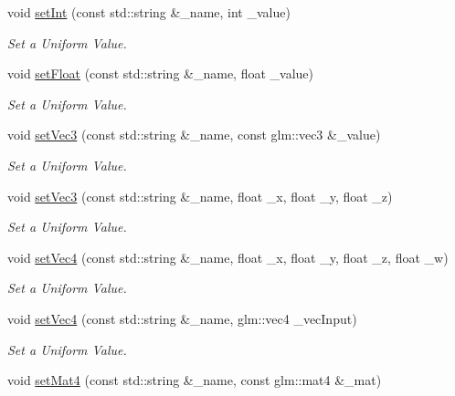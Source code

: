 \begin{DoxyCompactItemize}
void \mbox{\hyperlink{classpiolot_1_1_g_l_shader_a5b8fd3a108bf576243a1e852872edf5c}{set\+Int}} (const std\+::string \&\+\_\+name, int \+\_\+value)
\begin{DoxyCompactList}\small\item\em Set a Uniform Value. \end{DoxyCompactList}\item 
void \mbox{\hyperlink{classpiolot_1_1_g_l_shader_af6323e1d0956064de4c43ef4fa41b0f1}{set\+Float}} (const std\+::string \&\+\_\+name, float \+\_\+value)
\begin{DoxyCompactList}\small\item\em Set a Uniform Value. \end{DoxyCompactList}\item 
void \mbox{\hyperlink{classpiolot_1_1_g_l_shader_a47d614244dc667768a36b9cea1675eca}{set\+Vec3}} (const std\+::string \&\+\_\+name, const glm\+::vec3 \&\+\_\+value)
\begin{DoxyCompactList}\small\item\em Set a Uniform Value. \end{DoxyCompactList}\item 
void \mbox{\hyperlink{classpiolot_1_1_g_l_shader_a293369149f4ad507543cb0fcd783afd1}{set\+Vec3}} (const std\+::string \&\+\_\+name, float \+\_\+x, float \+\_\+y, float \+\_\+z)
\begin{DoxyCompactList}\small\item\em Set a Uniform Value. \end{DoxyCompactList}\item 
void \mbox{\hyperlink{classpiolot_1_1_g_l_shader_a700a4f95289f10e63c5d2bc0719d99e3}{set\+Vec4}} (const std\+::string \&\+\_\+name, float \+\_\+x, float \+\_\+y, float \+\_\+z, float \+\_\+w)
\begin{DoxyCompactList}\small\item\em Set a Uniform Value. \end{DoxyCompactList}\item 
void \mbox{\hyperlink{classpiolot_1_1_g_l_shader_a1f9299d4a1401de2901306e26d020a51}{set\+Vec4}} (const std\+::string \&\+\_\+name, glm\+::vec4 \+\_\+vec\+Input)
\begin{DoxyCompactList}\small\item\em Set a Uniform Value. \end{DoxyCompactList}\item 
void \mbox{\hyperlink{classpiolot_1_1_g_l_shader_a56d846ae1d7c6adc579c5de37db02546}{set\+Mat4}} (const std\+::string \&\+\_\+name, const glm\+::mat4 \&\+\_\+mat)

\end{DoxyCompactItemize}
